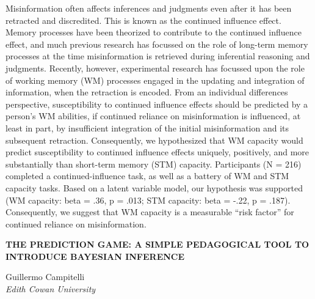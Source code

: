 \documentclass[]{article}
\begin{document}
Misinformation often affects inferences and judgments even after it has
been retracted and discredited. This is known as the continued influence
effect. Memory processes have been theorized to contribute to the
continued influence effect, and much previous research has focussed on
the role of long-term memory processes at the time misinformation is
retrieved during inferential reasoning and judgments. Recently, however,
experimental research has focussed upon the role of working memory (WM)
processes engaged in the updating and integration of information, when
the retraction is encoded. From an individual differences perspective,
susceptibility to continued influence effects should be predicted by a
person's WM abilities, if continued reliance on misinformation is
influenced, at least in part, by insufficient integration of the initial
misinformation and its subsequent retraction. Consequently, we
hypothesized that WM capacity would predict susceptibility to continued
influence effects uniquely, positively, and more substantially than
short-term memory (STM) capacity. Participants (N = 216) completed a
continued-influence task, as well as a battery of WM and STM capacity
tasks. Based on a latent variable model, our hypothesis was supported
(WM capacity: beta = .36, p = .013; STM capacity: beta = -.22, p =
.187). Consequently, we suggest that WM capacity is a measurable ``risk
factor'' for continued reliance on misinformation.\\
\pagebreak  

\textbf{THE PREDICTION GAME: A SIMPLE PEDAGOGICAL TOOL TO INTRODUCE
BAYESIAN INFERENCE}

Guillermo Campitelli\\
\emph{Edith Cowan University }
\end{document}
